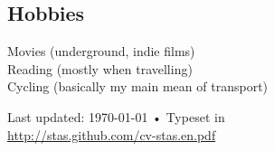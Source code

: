 \documentclass[10pt, a4paper]{article}
\begin{document}
\subsection*{Hobbies}
 Movies (underground, indie films)\\
Reading (mostly when travelling)\\
Cycling (basically my main mean of transport)


\vfill{}

\begin{center}
{\scriptsize  Last updated: \today\- •\- 
Typeset in \href{http://nitens.org/taraborelli/cvtex}{
\XeTeX }\\
\href{http://stas.github.com/cv-stas.en.pdf}{http://stas.github.com/cv-stas.en.pdf}}
\end{center}
\end{document}
